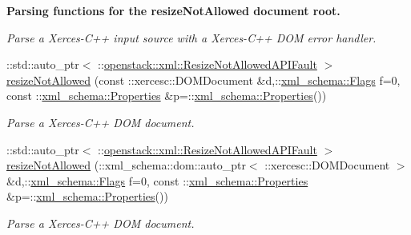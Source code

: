 \begin{Indent}{\bf Parsing functions for the resizeNotAllowed document root.}
\begin{DoxyCompactItemize}
\begin{DoxyCompactList}\small\item\em Parse a Xerces-\/C++ input source with a Xerces-\/C++ DOM error handler. \item\end{DoxyCompactList}\item 
::std::auto\_\-ptr$<$ ::\hyperlink{classopenstack_1_1xml_1_1ResizeNotAllowedAPIFault}{openstack::xml::ResizeNotAllowedAPIFault} $>$ \hyperlink{namespaceopenstack_1_1xml_a6cdffc65c001c27d340571f52d190185}{resizeNotAllowed} (const ::xercesc::DOMDocument \&d,::\hyperlink{namespacexml__schema_affb4c227cbd9aa7453dd1dc5a1401943}{xml\_\-schema::Flags} f=0, const ::\hyperlink{namespacexml__schema_ad27ce19a7ee1d3b1064092648898f64c}{xml\_\-schema::Properties} \&p=::\hyperlink{namespacexml__schema_ad27ce19a7ee1d3b1064092648898f64c}{xml\_\-schema::Properties}())
\begin{DoxyCompactList}\small\item\em Parse a Xerces-\/C++ DOM document. \item\end{DoxyCompactList}\item 
::std::auto\_\-ptr$<$ ::\hyperlink{classopenstack_1_1xml_1_1ResizeNotAllowedAPIFault}{openstack::xml::ResizeNotAllowedAPIFault} $>$ \hyperlink{namespaceopenstack_1_1xml_aaec2ed9f2ae5e21443e04f462d6efdcd}{resizeNotAllowed} (::xml\_\-schema::dom::auto\_\-ptr$<$ ::xercesc::DOMDocument $>$ \&d,::\hyperlink{namespacexml__schema_affb4c227cbd9aa7453dd1dc5a1401943}{xml\_\-schema::Flags} f=0, const ::\hyperlink{namespacexml__schema_ad27ce19a7ee1d3b1064092648898f64c}{xml\_\-schema::Properties} \&p=::\hyperlink{namespacexml__schema_ad27ce19a7ee1d3b1064092648898f64c}{xml\_\-schema::Properties}())
\begin{DoxyCompactList}\small\item\em Parse a Xerces-\/C++ DOM document. \item\end{DoxyCompactList}\end{DoxyCompactItemize}
\end{Indent}

